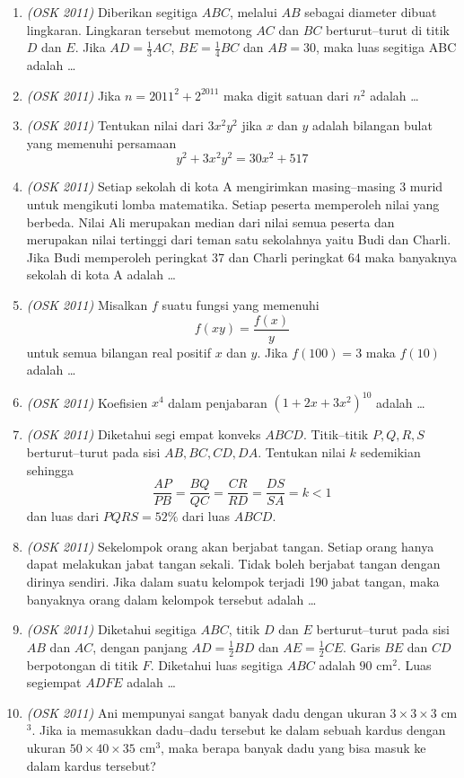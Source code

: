 \documentclass[11pt]{scrartcl}
\begin{document}
\begin{enumerate}
\item \textit{(OSK 2011)} Diberikan segitiga $ABC$, melalui $AB$ sebagai diameter dibuat lingkaran. Lingkaran tersebut memotong $AC$ dan $BC$ berturut–turut di titik $D$ dan $E$. Jika $AD = \frac13 AC$, $BE = \frac14 BC$ dan $AB = 30$, maka luas segitiga ABC adalah \dots

\item \textit{(OSK 2011)} Jika $n = 2011^2 + 2^{2011}$ maka digit satuan dari $n^2$ adalah \dots

\item \textit{(OSK 2011)} Tentukan nilai dari $3x^2 y^2$ jika $x$ dan $y$ adalah bilangan bulat yang memenuhi persamaan  
\[
y^2 + 3x^2 y^2 = 30x^2 + 517
\]

\item \textit{(OSK 2011)} Setiap sekolah di kota A mengirimkan masing–masing 3 murid untuk mengikuti lomba matematika. Setiap peserta memperoleh nilai yang berbeda. Nilai Ali merupakan median dari nilai semua peserta dan merupakan nilai tertinggi dari teman satu sekolahnya yaitu Budi dan Charli. Jika Budi memperoleh peringkat 37 dan Charli peringkat 64 maka banyaknya sekolah di kota A adalah \dots

\item \textit{(OSK 2011)} Misalkan $f$ suatu fungsi yang memenuhi  
\[
f(xy) = \frac{f(x)}{y}
\]
untuk semua bilangan real positif $x$ dan $y$. Jika $f(100) = 3$ maka $f(10)$ adalah \dots

\item \textit{(OSK 2011)} Koefisien $x^4$ dalam penjabaran $(1 + 2x + 3x^2)^{10}$ adalah \dots

\item \textit{(OSK 2011)} Diketahui segi empat konveks $ABCD$. Titik–titik $P,Q,R,S$ berturut–turut pada sisi $AB, BC, CD, DA$. Tentukan nilai $k$ sedemikian sehingga  
\[
\frac{AP}{PB} = \frac{BQ}{QC} = \frac{CR}{RD} = \frac{DS}{SA} = k < 1
\]
dan luas dari $PQRS = 52\%$ dari luas $ABCD$.

\item \textit{(OSK 2011)} Sekelompok orang akan berjabat tangan. Setiap orang hanya dapat melakukan jabat tangan sekali. Tidak boleh berjabat tangan dengan dirinya sendiri. Jika dalam suatu kelompok terjadi 190 jabat tangan, maka banyaknya orang dalam kelompok tersebut adalah \dots

\item \textit{(OSK 2011)} Diketahui segitiga $ABC$, titik $D$ dan $E$ berturut–turut pada sisi $AB$ dan $AC$, dengan panjang $AD = \frac12 BD$ dan $AE = \frac12 CE$. Garis $BE$ dan $CD$ berpotongan di titik $F$. Diketahui luas segitiga $ABC$ adalah $90$ cm$^2$. Luas segiempat $ADFE$ adalah \dots

\item \textit{(OSK 2011)} Ani mempunyai sangat banyak dadu dengan ukuran $3 \times 3 \times 3$ cm$^3$. Jika ia memasukkan dadu–dadu tersebut ke dalam sebuah kardus dengan ukuran $50 \times 40 \times 35$ cm$^3$, maka berapa banyak dadu yang bisa masuk ke dalam kardus tersebut?
\end{enumerate}
\end{document}
